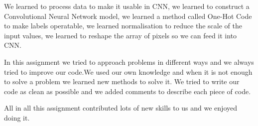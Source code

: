 \documentclass[onecolumn]{article}
\begin{document}
We learned to process data to make it usable in CNN, we learned to construct a Convolutional Neural Network model, we learned a method called One-Hot Code to make labels operatable, we learned normalisation to reduce the scale of the input values, we learned to reshape the array of pixels so we can feed it into CNN.

In this assignment we tried to approach problems in different ways and we always tried to improve our code.We used our own knowledge and when it is not enough to solve a problem we learned new methods to solve it. We tried to write our code as clean as possible and we added comments to describe each piece of code.

All in all this assignment contributed lots of new skills to us and we enjoyed doing it.
\end{document}
